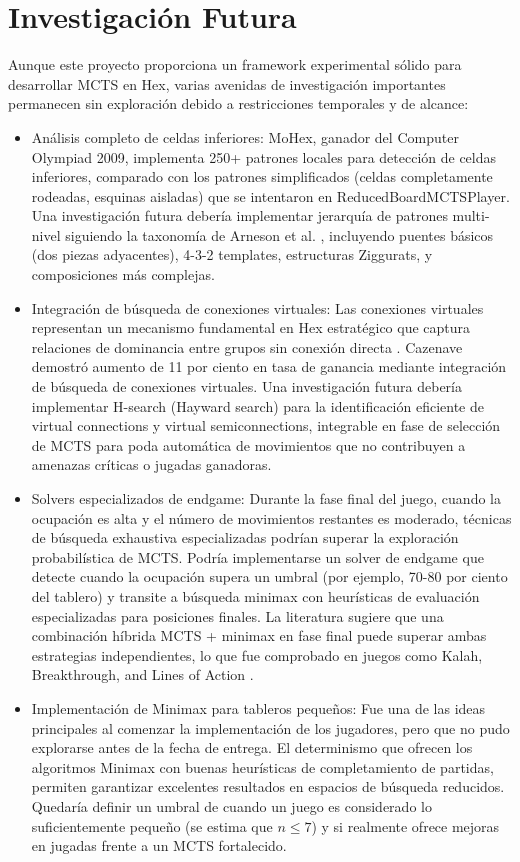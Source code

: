\documentclass[12pt]{article}
\begin{document}
\section{Investigación Futura}

Aunque este proyecto proporciona un framework experimental sólido para desarrollar MCTS en Hex, varias avenidas de investigación importantes permanecen sin exploración debido a restricciones temporales y de alcance:

\begin{itemize}
	\item Análisis completo de celdas inferiores: MoHex, ganador del Computer Olympiad 2009, implementa 250+ patrones locales para detección de celdas inferiores, comparado con los patrones simplificados (celdas completamente rodeadas, esquinas aisladas) que se intentaron en ReducedBoardMCTSPlayer. Una investigación futura debería implementar jerarquía de patrones multi-nivel siguiendo la taxonomía de Arneson et al. \cite{Arneson2010}, incluyendo puentes básicos (dos piezas adyacentes), 4-3-2 templates, estructuras Ziggurats, y composiciones más complejas.
	\item Integración de búsqueda de conexiones virtuales: Las conexiones virtuales representan un mecanismo fundamental en Hex estratégico que captura relaciones de dominancia entre grupos sin conexión directa \cite{Arneson2010}. Cazenave \cite{Cazenave2009} demostró aumento de 11 por ciento en tasa de ganancia mediante integración de búsqueda de conexiones virtuales. Una investigación futura debería implementar H-search (Hayward search) para la identificación eficiente de virtual connections y virtual semiconnections, integrable en fase de selección de MCTS para poda automática de movimientos que no contribuyen a amenazas críticas o jugadas ganadoras.
	\item Solvers especializados de endgame: Durante la fase final del juego, cuando la ocupación es alta y el número de movimientos restantes es moderado, técnicas de búsqueda exhaustiva especializadas podrían superar la exploración probabilística de MCTS. Podría implementarse un solver de endgame que detecte cuando la ocupación supera un umbral (por ejemplo, 70-80 por ciento del tablero) y transite a búsqueda minimax con heurísticas de evaluación especializadas para posiciones finales. La literatura sugiere que una combinación híbrida MCTS + minimax en fase final puede superar ambas estrategias independientes, lo que fue comprobado en juegos como Kalah, Breakthrough, and Lines of Action \cite{Lanctot2014}.
	\item Implementación de Minimax para tableros pequeños: Fue una de las ideas principales al comenzar la implementación de los jugadores, pero que no pudo explorarse antes de la fecha de entrega. El determinismo que ofrecen los algoritmos Minimax con buenas heurísticas de completamiento de partidas, permiten garantizar excelentes resultados en espacios de búsqueda reducidos. Quedaría definir un umbral de cuando un juego es considerado lo suficientemente pequeño (se estima que $n \leq 7$) y si realmente ofrece mejoras en jugadas frente a un MCTS fortalecido.

\end{itemize}
\end{document}
